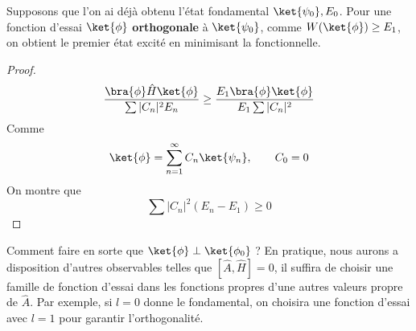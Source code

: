 	Supposons que l'on ai déjà obtenu l'état fondamental $\ket{\psi_0}, E_0$. Pour une fonction 
	d'essai $\ket{\phi}$ \textbf{orthogonale} à $\ket{\psi_0}$, comme $W(\ket{\phi})\geq E_1$, on 
	obtient le premier état excité en minimisant la fonctionnelle.\\
	\begin{proof}\ \\
	\begin{equation}
	\dfrac{\bra{\phi}\hat{H}\ket{\phi}}{\sum |C_n|^2 E_n}\geq 
	\dfrac{E_1\bra{\phi}\ket{\phi}}{E_1\sum |C_n|^2}
	\end{equation}
	Comme
	\begin{equation}
	\ket{\phi} = \sum_{n=1}^\infty C_n\ket{\psi_n},\qquad C_0=0
	\end{equation}
	On montre que
	\begin{equation}
	\sum |C_n|^2(E_n-E_1)\geq 0
	\end{equation}
	\end{proof}
	Comment faire en sorte que $\ket{\phi}\perp\ket{\phi_0}$ ? En pratique, nous aurons a 
	disposition d'autres observables telles que $[\hat{A},\hat{H}]=0$, il suffira de choisir 
	une famille de fonction d'essai dans les fonctions propres d'une autres valeurs propre 
	de $\hat{A}$. Par exemple, si $l=0$ donne le fondamental, on choisira une fonction d'essai 
	avec $l=1$ pour garantir l'orthogonalité.
	
	
	